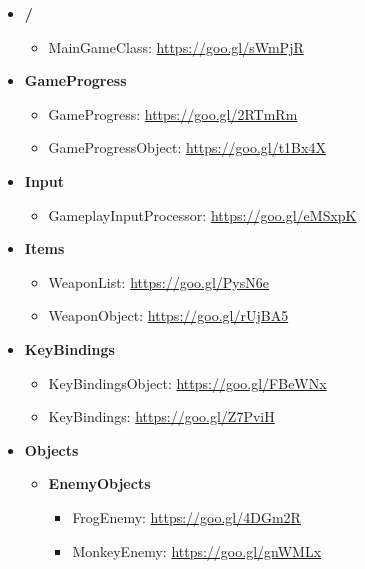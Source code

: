 \documentclass[12p]{article}
\begin{document}
\renewcommand{\labelitemi}{\faFolderOpen}
\renewcommand{\labelitemii}{\faFile}
\renewcommand{\labelitemiii}{\faFile}
\begin{itemize}
    \item \textbf{/}
    \begin{itemize}
        \item MainGameClass: \url{https://goo.gl/sWmPjR}
    \end{itemize}
    
    \item \textbf{GameProgress}
    \begin{itemize}
        \item GameProgress: \url{https://goo.gl/2RTmRm} 
        \item GameProgressObject: \url{https://goo.gl/t1Bx4X}
    \end{itemize}
    
    \item \textbf{Input}
    \begin{itemize}
        \item GameplayInputProcessor: \url{https://goo.gl/eMSxpK}
    \end{itemize}
    
    \item \textbf{Items}
    \begin{itemize}
        \item WeaponList: \url{https://goo.gl/PysN6e}
        \item WeaponObject: \url{https://goo.gl/rUjBA5}
    \end{itemize}
    
    \item \textbf{KeyBindings}
    \begin{itemize}
        \item KeyBindingsObject: \url{https://goo.gl/FBeWNx}
        \item KeyBindings: \url{https://goo.gl/Z7PviH}
    \end{itemize}
    
    \item \textbf{Objects}
    \begin{itemize}
        \item[\faFolderOpen] \textbf{EnemyObjects}
        \begin{itemize}
            \item FrogEnemy: \url{https://goo.gl/4DGm2R}
            \item MonkeyEnemy: \url{https://goo.gl/gnWMLx}
        \end{itemize}
        

\end{itemize}
\end{itemize}
\end{document}
